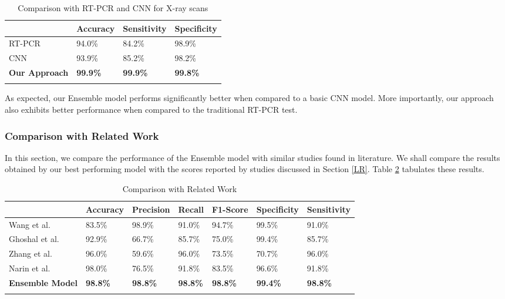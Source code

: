  \begin{longtable}{| p{} | p{} |  p{} |   p{} |} 
    \hline
& \textbf{Accuracy} & \textbf{Sensitivity} & \textbf{Specificity} \\
\hline

			RT-PCR      &94.0\%   &84.2\%    &98.9\%  
\\\hline
			CNN    &93.9\%   &85.2\%    &98.2\% 
\\\hline
			\textbf{Our Approach}   &\textbf{99.9\%}   &\textbf{99.9\%}    &\textbf{99.8\%} 
\\\hline
 \caption{Comparison with RT-PCR and CNN for X-ray scans}  \label{tab:comp}
    \end{longtable}
\vspace{-1em}
As expected, our Ensemble model performs significantly better when compared to a basic CNN model. More importantly, our approach also exhibits better performance when compared to the traditional RT-PCR test.

\subsubsection{Comparison with Related Work}

In this section, we compare the performance of the Ensemble model with similar studies found in literature. We shall compare the results obtained by our best performing model with the scores reported by studies discussed in Section \ref{LR}. Table \ref{tab:relWorkXray} tabulates these results.

\vspace{1em}
 \begin{longtable}{| p{} |  p{} |   p{} | p{} | p{} | p{} | p{} |} 
    \hline
& \textbf{Accuracy} & \textbf{Precision} & \textbf{Recall} & \textbf{F1-Score} & \textbf{Specificity} & \textbf{Sensitivity} \\
\hline
Wang et al. \cite{LWA2020}   &83.5\%    &98.9\%     &91.0\%   &94.7\%    &99.5\%     &91.0\%
\\\hline

Ghoshal et al. \cite{GHT2020}   &92.9\%    &66.7\%     &85.7\%   &75.0\%    &99.4\%     &85.7\%
\\\hline
Zhang et al. \cite{ZXS+2020}   &96.0\%    &59.6\%     &96.0\%   &73.5\%    &70.7\%     &96.0\%
\\\hline
Narin et al. \cite{AKP2020}   &98.0\%    &76.5\%     &91.8\%   &83.5\%    &96.6\%     &91.8\%
\\\hline
    \textbf{Ensemble Model}    &\textbf{98.8\%}   &\textbf{98.8\%}    &\textbf{98.8\%}    &\textbf{98.8\%}   &\textbf{99.4\%}   &\textbf{98.8\%}  
\\\hline
 \caption{Comparison with Related Work}  \label{tab:relWorkXray}

    \end{longtable}
\vspace{-2em}

